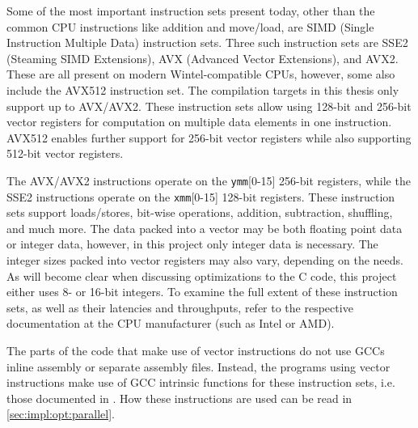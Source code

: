 Some of the most important instruction sets present today, other than the common CPU instructions like addition and move/load, are SIMD (Single Instruction Multiple Data) instruction sets. Three such instruction sets are SSE2 (Steaming SIMD Extensions), AVX (Advanced Vector Extensions), and AVX2. These are all present on modern Wintel-compatible CPUs, however, some also include the AVX512 instruction set. The compilation targets in this thesis only support up to AVX/AVX2. These instruction sets allow using 128-bit and 256-bit vector registers for computation on multiple data elements in one instruction. AVX512 enables further support for 256-bit vector registers while also supporting 512-bit vector registers.

The AVX/AVX2 instructions operate on the \texttt{ymm}[0-15] 256-bit registers, while the SSE2 instructions operate on the \texttt{xmm}[0-15] 128-bit registers. These instruction sets support loads/stores, bit-wise operations, addition, subtraction, shuffling, and much more. The data packed into a vector may be both floating point data or integer data, however, in this project only integer data is necessary. The integer sizes packed into vector registers may also vary, depending on the needs. As will become clear when discussing optimizations to the C code, this project either uses 8- or 16-bit integers. To examine the full extent of these instruction sets, as well as their latencies and throughputs, refer to the respective documentation at the CPU manufacturer (such as Intel or AMD).

The parts of the code that make use of vector instructions do not use GCCs inline assembly or separate assembly files. Instead, the programs using vector instructions make use of GCC intrinsic functions for these instruction sets, i.e. those documented in \cite{IntelIntr}. How these instructions are used can be read in \cref{sec:impl:opt:parallel}.


\newpage
